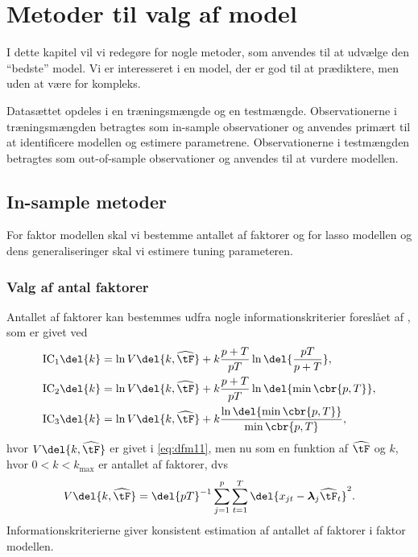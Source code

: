 \chapter{Metoder til valg af model} \label{ch:metoder}
I dette kapitel vil vi redegøre for nogle metoder, som anvendes til at udvælge den ``bedste'' model. 
Vi er interesseret i en model, der er god til at prædiktere, men uden at være for kompleks.

Datasættet opdeles i en træningsmængde og en testmængde. 
Observationerne i træningsmængden betragtes som in-sample observationer og anvendes primært til at identificere modellen og estimere parametrene. 
Observationerne i testmængden betragtes som out-of-sample observationer og anvendes til at vurdere modellen. 
 
\section{In-sample metoder}
For faktor modellen skal vi bestemme antallet af faktorer og for lasso modellen og dens generaliseringer skal vi estimere tuning parameteren.

\subsection{Valg af antal faktorer} \label{sec:faktorer}
Antallet af faktorer kan bestemmes udfra nogle informationskriterier foreslået af \citep{Bai_Ng}, som er givet ved
\begin{align}
\text{IC}_1 \del{k} &= \ln V \del{k, \widehat{\tF}} + k \frac{p + T}{p T} \ln \del{\frac{p T}{p + T}}, \label{eq:ic1} \\
\text{IC}_2 \del{k} &= \ln V \del{k, \widehat{\tF}} + k \frac{p + T}{p T} \ln \del{ \min \cbr{p, T}}, \label{eq:ic2} \\
\text{IC}_3 \del{k} &= \ln V \del{k, \widehat{\tF}} + k \frac{\ln \del{\min \cbr{p, T}}}{\min \cbr{p, T}}, \label{eq:ic3}
\end{align}
hvor \(V \del{k, \widehat{\tF}}\) er givet i \eqref{eq:dfm11}, men nu som en funktion af \(\widehat{\tF}\) og \(k\), hvor \(0<k<k_\text{max}\) er antallet af faktorer, dvs
\begin{align*}
V \del{k, \widehat{\tF}} = \del{p T}^{-1} \sum_{j=1}^p \sum_{t=1}^{T} \del{x_{jt} -\boldsymbol{\lambda}_j \widehat{\tF}_t}^2.
\end{align*}
Informationskriterierne giver konsistent estimation af antallet af faktorer i faktor modellen.

